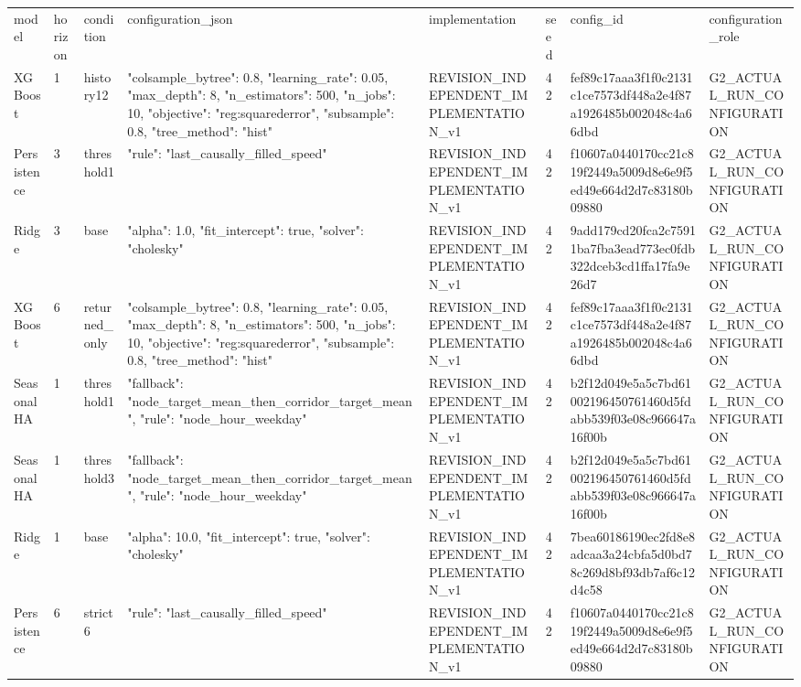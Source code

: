\begin{longtable}{llllllll}
model & horizon & condition & configuration\_json & implementation & seed & config\_id & configuration\_role \\
XGBoost & 1 & history12 & {"colsample\_bytree": 0.8, "learning\_rate": 0.05, "max\_depth": 8, "n\_estimators": 500, "n\_jobs": 10, "objective": "reg:squarederror", "subsample": 0.8, "tree\_method": "hist"} & REVISION\_INDEPENDENT\_IMPLEMENTATION\_v1 & 42 & fef89c17aaa3f1f0c2131c1ce7573df448a2e4f87a1926485b002048c4a66dbd & G2\_ACTUAL\_RUN\_CONFIGURATION \\
Persistence & 3 & threshold1 & {"rule": "last\_causally\_filled\_speed"} & REVISION\_INDEPENDENT\_IMPLEMENTATION\_v1 & 42 & f10607a0440170cc21c819f2449a5009d8e6e9f5ed49e664d2d7c83180b09880 & G2\_ACTUAL\_RUN\_CONFIGURATION \\
Ridge & 3 & base & {"alpha": 1.0, "fit\_intercept": true, "solver": "cholesky"} & REVISION\_INDEPENDENT\_IMPLEMENTATION\_v1 & 42 & 9add179cd20fca2c75911ba7fba3ead773ec0fdb322dceb3cd1ffa17fa9e26d7 & G2\_ACTUAL\_RUN\_CONFIGURATION \\
XGBoost & 6 & returned\_only & {"colsample\_bytree": 0.8, "learning\_rate": 0.05, "max\_depth": 8, "n\_estimators": 500, "n\_jobs": 10, "objective": "reg:squarederror", "subsample": 0.8, "tree\_method": "hist"} & REVISION\_INDEPENDENT\_IMPLEMENTATION\_v1 & 42 & fef89c17aaa3f1f0c2131c1ce7573df448a2e4f87a1926485b002048c4a66dbd & G2\_ACTUAL\_RUN\_CONFIGURATION \\
SeasonalHA & 1 & threshold1 & {"fallback": "node\_target\_mean\_then\_corridor\_target\_mean", "rule": "node\_hour\_weekday"} & REVISION\_INDEPENDENT\_IMPLEMENTATION\_v1 & 42 & b2f12d049e5a5c7bd61002196450761460d5fdabb539f03e08c966647a16f00b & G2\_ACTUAL\_RUN\_CONFIGURATION \\
SeasonalHA & 1 & threshold3 & {"fallback": "node\_target\_mean\_then\_corridor\_target\_mean", "rule": "node\_hour\_weekday"} & REVISION\_INDEPENDENT\_IMPLEMENTATION\_v1 & 42 & b2f12d049e5a5c7bd61002196450761460d5fdabb539f03e08c966647a16f00b & G2\_ACTUAL\_RUN\_CONFIGURATION \\
Ridge & 1 & base & {"alpha": 10.0, "fit\_intercept": true, "solver": "cholesky"} & REVISION\_INDEPENDENT\_IMPLEMENTATION\_v1 & 42 & 7bea60186190ec2fd8e8adcaa3a24cbfa5d0bd78c269d8bf93db7af6c12d4c58 & G2\_ACTUAL\_RUN\_CONFIGURATION \\
Persistence & 6 & strict6 & {"rule": "last\_causally\_filled\_speed"} & REVISION\_INDEPENDENT\_IMPLEMENTATION\_v1 & 42 & f10607a0440170cc21c819f2449a5009d8e6e9f5ed49e664d2d7c83180b09880 & G2\_ACTUAL\_RUN\_CONFIGURATION \\

\end{longtable}
